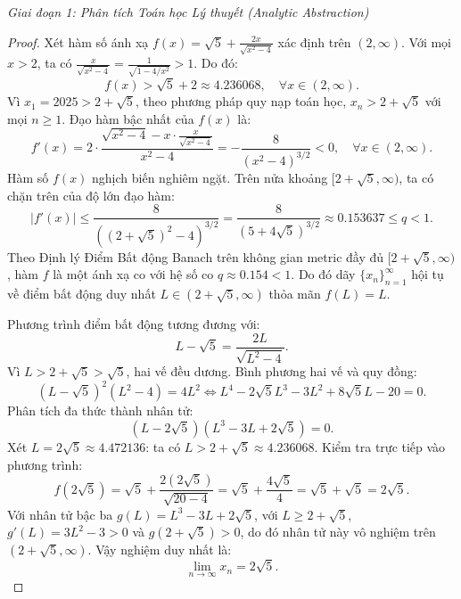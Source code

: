 \documentclass{article}
\begin{document}
\vspace{0.5em}\noindent\emph{Giai đoạn 1: Phân tích Toán học Lý thuyết (Analytic Abstraction)}

\begin{proof}
Xét hàm số ánh xạ $f(x) = \sqrt{5} + \frac{2x}{\sqrt{x^2 - 4}}$ xác định trên $(2, \infty)$.
Với mọi $x > 2$, ta có $\frac{x}{\sqrt{x^2 - 4}} = \frac{1}{\sqrt{1 - 4/x^2}} > 1$. Do đó:
\begin{equation}
    f(x) > \sqrt{5} + 2 \approx 4.236068, \quad \forall x \in (2, \infty).
\end{equation}
Vì $x_1 = 2025 > 2 + \sqrt{5}$, theo phương pháp quy nạp toán học, $x_n > 2 + \sqrt{5}$ với mọi $n \ge 1$.
Đạo hàm bậc nhất của $f(x)$ là:
\begin{equation}
    f'(x) = 2 \cdot \frac{\sqrt{x^2 - 4} - x \cdot \frac{x}{\sqrt{x^2 - 4}}}{x^2 - 4} = -\frac{8}{(x^2 - 4)^{3/2}} < 0, \quad \forall x \in (2, \infty).
\end{equation}
Hàm số $f(x)$ nghịch biến nghiêm ngặt. Trên nửa khoảng $[2 + \sqrt{5}, \infty)$, ta có chặn trên của độ lớn đạo hàm:
\begin{equation}
    |f'(x)| \le \frac{8}{((2 + \sqrt{5})^2 - 4)^{3/2}} = \frac{8}{(5 + 4\sqrt{5})^{3/2}} \approx 0.153637 \le q < 1.
\end{equation}
Theo Định lý Điểm Bất động Banach trên không gian metric đầy đủ $[2+\sqrt{5}, \infty)$, hàm $f$ là một ánh xạ co với hệ số co $q \approx 0.154 < 1$. Do đó dãy $\{x_n\}_{n=1}^\infty$ hội tụ về điểm bất động duy nhất $L \in (2+\sqrt{5}, \infty)$ thỏa mãn $f(L) = L$.

Phương trình điểm bất động tương đương với:
\begin{equation}
    L - \sqrt{5} = \frac{2L}{\sqrt{L^2 - 4}}.
\end{equation}
Vì $L > 2 + \sqrt{5} > \sqrt{5}$, hai vế đều dương. Bình phương hai vế và quy đồng:
\begin{equation}
    (L - \sqrt{5})^2(L^2 - 4) = 4L^2 \iff L^4 - 2\sqrt{5}L^3 - 3L^2 + 8\sqrt{5}L - 20 = 0.
\end{equation}
Phân tích đa thức thành nhân tử:
\begin{equation}
    (L - 2\sqrt{5})(L^3 - 3L + 2\sqrt{5}) = 0.
\end{equation}
Xét $L = 2\sqrt{5} \approx 4.472136$: ta có $L > 2 + \sqrt{5} \approx 4.236068$. Kiểm tra trực tiếp vào phương trình:
\begin{equation}
    f(2\sqrt{5}) = \sqrt{5} + \frac{2(2\sqrt{5})}{\sqrt{20 - 4}} = \sqrt{5} + \frac{4\sqrt{5}}{4} = \sqrt{5} + \sqrt{5} = 2\sqrt{5}.
\end{equation}
Với nhân tử bậc ba $g(L) = L^3 - 3L + 2\sqrt{5}$, với $L \ge 2 + \sqrt{5}$, $g'(L) = 3L^2 - 3 > 0$ và $g(2+\sqrt{5}) > 0$, do đó nhân tử này vô nghiệm trên $(2+\sqrt{5}, \infty)$. Vậy nghiệm duy nhất là:
\begin{equation}
    \lim_{n\to\infty} x_n = 2\sqrt{5}.
\end{equation}
\end{proof}
\end{document}
